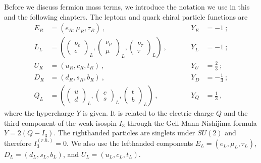 Before we discuss fermion mass terms, we introduce the notation we use in this and the following chapters. The leptons and quark chiral particle functions are
\begin{align}
	E_R &= (e_R,\mu_R,\tau_R) \ , &&\quad &Y_E &= -1 \ ; \\
	L_L &= \left(\begin{pmatrix} \nu_e \\ e \end{pmatrix}_L,
	\begin{pmatrix} \nu_\mu \\ \mu \end{pmatrix}_L,
	\begin{pmatrix} \nu_\tau \\ \tau \end{pmatrix}_L\right) \ , &&\quad &Y_L &= -1 \ ; \\
	U_R &= (u_R,c_R,t_R) \ , &&\quad &Y_U &= \frac{2}{3} \ ; \\
	D_R &= (d_R,s_R,b_R) \ , &&\quad &Y_D &= -\frac{1}{3} \ ; \\
	Q_L &= \left(\begin{pmatrix} u \\ d \end{pmatrix}_L,
	\begin{pmatrix} c \\ s \end{pmatrix}_L,
	\begin{pmatrix} t \\ b \end{pmatrix}_L\right) \ , &&\quad &Y_Q &= \frac{1}{3} \ ,
\end{align}
where the hypercharge $Y$ is given. It is related to the electric charge $Q$ and the third component of the weak isospin $I_3$ through the Gell-Mann-Nishijima formula $Y = 2(Q-I_3)$. The righthanded particles are singlets under $SU(2)$ and therefore $I^{(r.h.)}_3=0$. We also use the lefthanded components $E_L = (e_L,\mu_L,\tau_L)$, $D_L = (d_L,s_L,b_L)$, and $U_L = (u_L,c_L,t_L)$.



